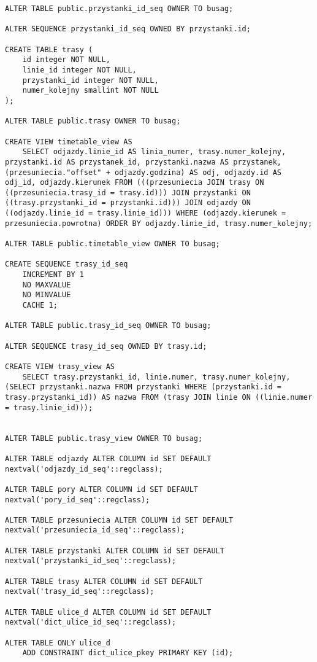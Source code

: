 \begin{lstlisting}
ALTER TABLE public.przystanki_id_seq OWNER TO busag;

ALTER SEQUENCE przystanki_id_seq OWNED BY przystanki.id;

CREATE TABLE trasy (
    id integer NOT NULL,
    linie_id integer NOT NULL,
    przystanki_id integer NOT NULL,
    numer_kolejny smallint NOT NULL
);

ALTER TABLE public.trasy OWNER TO busag;

CREATE VIEW timetable_view AS
    SELECT odjazdy.linie_id AS linia_numer, trasy.numer_kolejny, przystanki.id AS przystanek_id, przystanki.nazwa AS przystanek, (przesuniecia."offset" + odjazdy.godzina) AS odj, odjazdy.id AS odj_id, odjazdy.kierunek FROM (((przesuniecia JOIN trasy ON ((przesuniecia.trasy_id = trasy.id))) JOIN przystanki ON ((trasy.przystanki_id = przystanki.id))) JOIN odjazdy ON ((odjazdy.linie_id = trasy.linie_id))) WHERE (odjazdy.kierunek = przesuniecia.powrotna) ORDER BY odjazdy.linie_id, trasy.numer_kolejny;

ALTER TABLE public.timetable_view OWNER TO busag;

CREATE SEQUENCE trasy_id_seq
    INCREMENT BY 1
    NO MAXVALUE
    NO MINVALUE
    CACHE 1;

ALTER TABLE public.trasy_id_seq OWNER TO busag;

ALTER SEQUENCE trasy_id_seq OWNED BY trasy.id;

CREATE VIEW trasy_view AS
    SELECT trasy.przystanki_id, linie.numer, trasy.numer_kolejny, (SELECT przystanki.nazwa FROM przystanki WHERE (przystanki.id = trasy.przystanki_id)) AS nazwa FROM (trasy JOIN linie ON ((linie.numer = trasy.linie_id)));


ALTER TABLE public.trasy_view OWNER TO busag;

ALTER TABLE odjazdy ALTER COLUMN id SET DEFAULT nextval('odjazdy_id_seq'::regclass);

ALTER TABLE pory ALTER COLUMN id SET DEFAULT nextval('pory_id_seq'::regclass);

ALTER TABLE przesuniecia ALTER COLUMN id SET DEFAULT nextval('przesuniecia_id_seq'::regclass);

ALTER TABLE przystanki ALTER COLUMN id SET DEFAULT nextval('przystanki_id_seq'::regclass);

ALTER TABLE trasy ALTER COLUMN id SET DEFAULT nextval('trasy_id_seq'::regclass);

ALTER TABLE ulice_d ALTER COLUMN id SET DEFAULT nextval('dict_ulice_id_seq'::regclass);

ALTER TABLE ONLY ulice_d
    ADD CONSTRAINT dict_ulice_pkey PRIMARY KEY (id);


\end{lstlisting}
